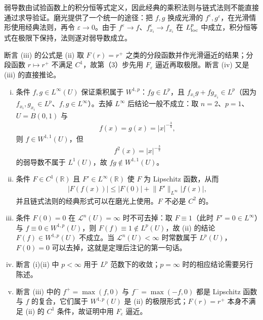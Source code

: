 \documentclass[../../main.tex]{subfiles}%
\begin{document}
\begin{remark}\label{remark:ch04-thm-4-4-动机}
弱导数由试验函数上的积分恒等式定义，因此经典的乘积法则与链式法则不能直接通过求导验证。磨光提供了一个统一的途径：把 $f,g$ 换成光滑的 $f^\varepsilon,g^\varepsilon$，在光滑情形使用经典法则，再令 $\varepsilon\to0$。由于 $f^\varepsilon\to f$、$f^\varepsilon_{x_i}\to f_{x_i}$ 在 $L^p_{\mathrm{loc}}$ 中成立，积分恒等式在极限下保持，法则遂对弱导数成立。

断言 (iii) 的公式是 (ii) 取 $F(r)=r^+$ 之类的分段函数并作光滑逼近的结果；分段函数 $r\mapsto r^+$ 不满足 $C^1$，故第（3）步先用 $F_\varepsilon$ 逼近再取极限。断言 (iv) 又是 (iii) 的直接推论。
\end{remark}

\begin{remark}\label{remark:ch04-thm-4-4-条件}
\begin{enumerate}[(i)]
\item 条件 $f,g\in L^\infty(U)$ 保证乘积属于 $W^{1,p}$：$fg\in L^p$，且 $f_{x_i}g+fg_{x_i}\in L^p$（因为 $f_{x_i},g_{x_i}\in L^p$、$f,g\in L^\infty$）。去掉 $L^\infty$ 后结论一般不成立：取 $n=2$、$p=1$、$U=B(0,1)$ 与
\begin{align*}
f(x)=g(x)=\lvert x\rvert^{-\frac34},
\end{align*}
则 $f\in W^{1,1}(U)$，但
\begin{align*}
f^2(x)=\lvert x\rvert^{-\frac32}
\end{align*}
的弱导数不属于 $L^1(U)$，故 $fg\notin W^{1,1}(U)$。
\item 条件 $F\in C^1(\mathbb{R})$ 且 $F'\in L^\infty(\mathbb{R})$ 使 $F$ 为 Lipschitz 函数，从而
\begin{align*}
\lvert F(f(x))\rvert\leqslant\lvert F(0)\rvert+\lVert F'\rVert_{L^\infty}\lvert f(x)\rvert,
\end{align*}
并且链式法则的经典形式可以在磨光上使用。$F$ 不必是 $C^2$ 的。
\item 条件 $F(0)=0$ 在 $\mathcal{L}^n(U)=\infty$ 时不可去掉：取 $F\equiv1$（此时 $F'=0\in L^\infty$）与 $f\equiv0\in W^{1,p}(U)$，则 $F(f)\equiv1\notin L^p(U)$，故 (ii) 的结论 $F(f)\in W^{1,p}(U)$ 不成立。当 $\mathcal{L}^n(U)<\infty$ 时常数属于 $L^p(U)$，$F(0)=0$ 可以去掉，这就是定理后注记的第一句话。
\item 断言 (i)(ii) 中 $p<\infty$ 用于 $L^p$ 范数下的收敛；$p=\infty$ 时的相应结论需要另行陈述。
\item 断言 (iii) 中的 $f^+=\max(f,0)$ 与 $f^-=\max(-f,0)$ 都是 Lipschitz 函数与 $f$ 的复合，它们属于 $W^{1,p}(U)$ 是 (ii) 的极限形式；$F(r)=r^+$ 本身不满足 (ii) 的 $C^1$ 条件，故证明中用 $F_\varepsilon$ 逼近。
\end{enumerate}
\end{remark}
\end{document}

